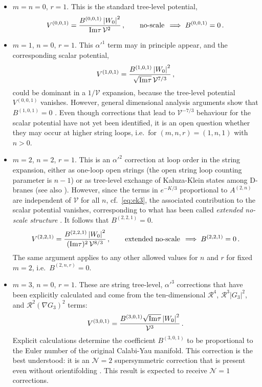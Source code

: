 \documentclass[12pt,a4wide]{article}
\def\V{\mathcal{V}}
\def\be{\begin{equation}}
\def\ee{\end{equation}}
\begin{document}
\begin{itemize}
\item $m=n=0$, $r=1$. This is the standard tree-level potential,
\be
V^{(0,0,1)}=\frac{B^{(0,0,1)} \left |W_0\right |^2}{\hbox{Im}\tau\, \V^2}\,, \qquad \hbox{no-scale}\, \implies B^{(0,0,1)}=0\,.
\ee

\item 
$m=1$, $n=0$, $r=1$. This $\alpha'^1$ term may in principle appear, and the corresponding scalar potential,
\be
V^{(1,0,1)}=\frac{B^{(1,0,1)} \left | W_0\right |^2}{\sqrt{\hbox{Im}\tau}\,\V^{7/3}}\,,
\ee
could be dominant in a $1/\V$ expansion, because the tree-level potential $V^{(0,0,1)}$ vanishes.
However, general dimensional analysis arguments show that $ B^{(1,0,1)}=0$ 
\cite{Cicoli:2021rub}. Even though corrections that lead to   $\V^{-7/3}$ behaviour for the scalar potential have not yet been identified, it is an open question whether they may occur at higher string loops, i.e.~for $(m,n,r)=(1,n,1)$ with $n>0$.

\item
$m=2$, $n=2$, $r=1$. This is an $\alpha'^2$ correction at loop order in the string expansion, either as one-loop open strings (the open string loop counting parameter is $n-1$) or as tree-level exchange of Kaluza-Klein states  among D-branes \cite{Berg:2005ja,Berg:2007wt, Cicoli:2007xp,Cicoli:2008va, Berg:2014ama} (see also \cite{vonGersdorff:2005bf}).
However, since the terms in $e^{-K/3}$ proportional to $A^{(2,n)}$ 
 are independent of $\V$ for all $n$, cf.~\eqref{eq:ek3}, the 
 associated
contribution to the scalar potential vanishes, corresponding to what has been called \emph{extended no-scale structure} \cite{Cicoli:2007xp, Cicoli:2008va}. It follows that  $B^{(2,2,1)}=0$. 
\be
V^{(2,2,1)}=\frac{B^{(2,2,1)} \left | W_0 \right |^2}{(\hbox{Im}\tau)^2 \, \V^{8/3}}\,,\qquad \hbox{extended no-scale}\, \implies B^{(2,2,1)}=0\,.
\ee
The same argument  applies to any other allowed values for $n$ and $r$ for fixed $m=2$, i.e.~$B^{(2,n,r)}=0$.  

\item $m=3$, $n=0$, $r=1$. These are string tree-level, $\alpha'^3$ corrections that have been explicitly calculated \cite{Liu:2022bfg} and come from the ten-dimensional $\mathcal{R}^4$, $\mathcal{R}^3 |G_3|^2$, and $\mathcal{R}^2 (\nabla G_3)^2$ terms:
\be\label{bbhk}
V^{(3,0,1)}=\frac{B^{(3,0,1)} \sqrt{\hbox{Im}\tau} \left |W_0 \right |^2}{\V^{3}}\,.
\ee
Explicit calculations determine the coefficient $B^{(3,0,1)}$ to be  proportional to the Euler number of the original Calabi-Yau manifold.
This correction is the best understood: it is an $\mathcal{N}=2$ supersymmetric correction that is present even without orientifolding \cite{GRISARU1986409,GROSS19861,Antoniadis:1997eg,Becker:2002nn}. This result is expected to receive $\mathcal{N}=1$ corrections.


\end{itemize}
\end{document}
